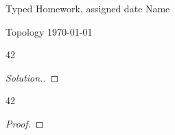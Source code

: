 \documentclass[12pt]{amsart}
\begin{document}
 



{\large
\noindent Typed Homework, assigned 
date %
\hfill
Name %

\vspace{.1in}

\noindent Topology \hfill \today}

\vspace{.25in}



\begin{reppprob}{42} %
\end{reppprob}

\begin{proof}[Solution.]
\end{proof}


\begin{reppthm}{42} %
\end{reppthm}

\begin{proof}
\end{proof}


\end{document}
